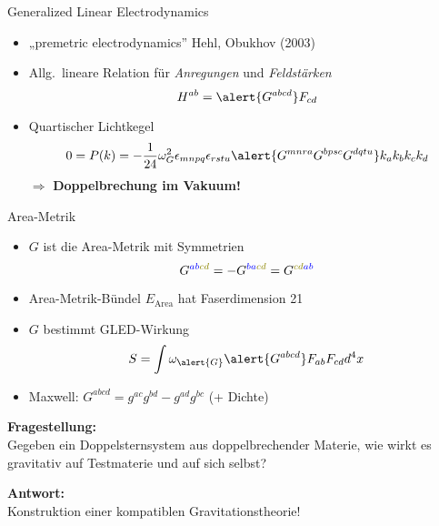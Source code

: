 \documentclass{beamer}
\begin{document}
    \begin{frame}{Generalized Linear Electrodynamics}
        \begin{itemize}
            \item „premetric electrodynamics” {\scriptsize \lbrack Hehl, Obukhov (2003)\rbrack}
            \item Allg.\ lineare Relation für \textit{Anregungen} und \textit{Feldstärken}
            \[
                H^{ab} = \alert{G^{abcd}} F_{cd}
            \]
            \item Quartischer Lichtkegel \[ 0 = P(k) = -\frac{1}{24} \omega_G^2 \epsilon_{mnpq} \epsilon_{rstu} \alert{G^{mnra} G^{bpsc} G^{dqtu}} k_a k_b k_c k_d \]
            $\Rightarrow$ \textbf{Doppelbrechung im Vakuum!}
        \end{itemize}
    \end{frame}

    \begin{frame}{Area-Metrik}
        \begin{itemize}
            \item \alert{$G$} ist die \alert{Area-Metrik} mit Symmetrien
            \[ G^{\color{blue}ab\color{olive}cd} = -G^{\color{blue}ba\color{olive}cd} = G^{\color{olive}cd\color{blue}ab} \]
            \item Area-Metrik-Bündel $E_\text{Area}$ hat Faserdimension 21
            \item \alert{$G$} bestimmt GLED-Wirkung \[ S = \int \omega_{\alert{G}} \alert{G^{abcd}} F_{ab} F_{cd} d^4 x \]
            \item Maxwell: $G^{abcd} = g^{ac} g^{bd} - g^{ad} g^{bc}$ (+ Dichte)
        \end{itemize}
    \end{frame}

    \begin{frame}
        \textbf{Fragestellung:} \\
        Gegeben ein Doppelsternsystem aus doppelbrechender Materie, wie wirkt es
        gravitativ auf Testmaterie und auf sich selbst?

        \alert{
            \textbf{Antwort:} \\
            Konstruktion einer kompatiblen Gravitationstheorie!
        }
    \end{frame}
\end{document}
